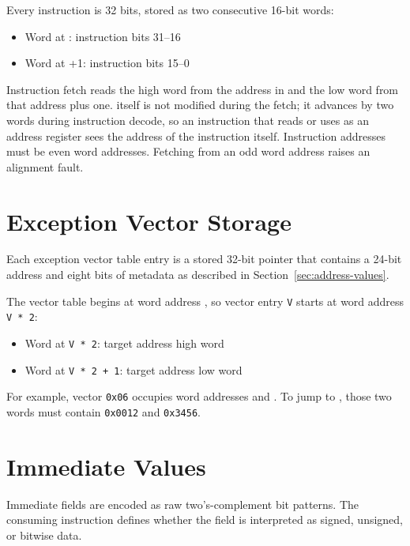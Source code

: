 Every instruction is 32 bits, stored as two consecutive 16-bit words:

\begin{itemize}
	\item Word at : instruction bits 31--16
	\item Word at +1: instruction bits 15--0
\end{itemize}

Instruction fetch reads the high word from the address in  and the low word from that address plus one. 
itself is not modified during the fetch; it advances by two words during instruction decode, so an instruction that
reads or uses  as an address register sees the address of the instruction itself. Instruction addresses must be
even word addresses. Fetching from an odd word address raises an alignment fault.

\section{Exception Vector Storage}
\label{sec:exception-vector-storage}

Each exception vector table entry is a stored 32-bit pointer that contains a 24-bit address and eight bits of metadata
as described in Section~\ref{sec:address-values}.

The vector table begins at word address , so vector entry \texttt{V} starts at word address \texttt{V *
	2}:

\begin{itemize}
	\item Word at \texttt{V * 2}: target address high word
	\item Word at \texttt{V * 2 + 1}: target address low word
\end{itemize}

For example, vector \texttt{0x06} occupies word addresses  and . To jump to
, those two words must contain \texttt{0x0012} and \texttt{0x3456}.

\section{Immediate Values}

Immediate fields are encoded as raw two's-complement bit patterns. The consuming instruction defines whether the field
is interpreted as signed, unsigned, or bitwise data.

